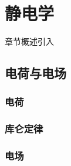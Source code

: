 \chapter{静电学}\label{10}

章节概述引入

\section{电荷与电场}\label{10-1}

\subsection{电荷}\label{10-1-1}

\subsection{库仑定律}\label{10-1-2}

\subsection{电场}\label{10-1-3}